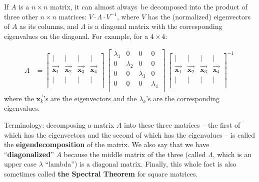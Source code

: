 \begin{framed}

If $A$ is a $n\times n$ matrix, it can almost always\footnotemark~be decomposed
into the product of three other $n\times n$ matrices: $V\cdot \Lambda \cdot
V^{-1}$, where $V$ has the (normalized) eigenvectors of $A$ as its columns, and
$\Lambda$ is a diagonal matrix with the corresponding eigenvalues on the
diagonal. For example, for a $4\times 4$:

\vspace{-.15in}
\begin{align*}
A &=
\begin{bmatrix}
| & | & | & | \\[6pt]
\overrightarrow{\textbf{x}_{1}} &
\overrightarrow{\textbf{x}_{2}} &
\overrightarrow{\textbf{x}_{3}} &
\overrightarrow{\textbf{x}_{4}} \\
| & | & | & | \\[6pt]
\end{bmatrix} \
\begin{bmatrix}
\lambda_1 & 0 & 0 & 0 \\
0 & \lambda_2 & 0 & 0 \\
0 & 0 & \lambda_3 & 0 \\
0 & 0 & 0 & \lambda_4 \\
\end{bmatrix} \
\begin{bmatrix}
| & | & | & | \\[6pt]
\overrightarrow{\textbf{x}_{1}} &
\overrightarrow{\textbf{x}_{2}} &
\overrightarrow{\textbf{x}_{3}} &
\overrightarrow{\textbf{x}_{4}} \\
| & | & | & | \\[6pt]
\end{bmatrix}^{-1} \
\end{align*}
where the $\overrightarrow{\textbf{x}_k}$'s are the eigenvectors and the
$\lambda_k$'s are the corresponding eigenvalues.
\end{framed}


\index{Spectral Theorem}

Terminology: decomposing a matrix $A$ into these three matrices -- the first of
which has the eigenvectors and the second of which has the eigenvalues -- is
called the \textbf{eigendecomposition} of the matrix. We also say that we have
``\textbf{diagonalized}'' $A$ because the middle matrix of the three (called
$\Lambda$, which is an upper case $\lambda$ ``lambda'') is a diagonal matrix.
Finally, this whole fact is also sometimes called \textbf{the Spectral Theorem}
for square matrices.

